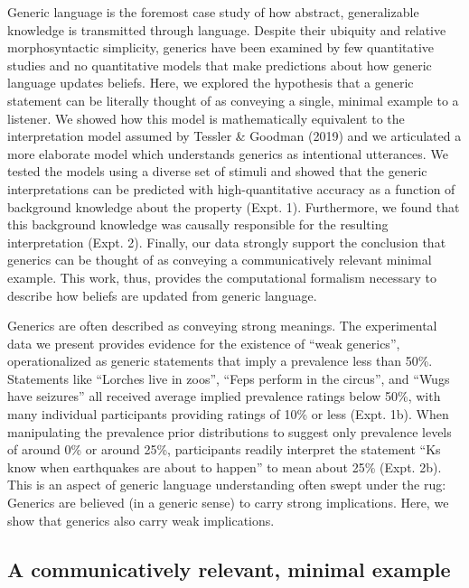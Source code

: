 \documentclass[floatsintext,doc]{apa6}
\begin{document}
Generic language is the foremost case study of how abstract, generalizable knowledge is transmitted through language.
Despite their ubiquity and relative morphosyntactic simplicity, generics have been examined by few quantitative studies and no quantitative models that make predictions about how generic language updates beliefs.
Here, we explored the hypothesis that a generic statement can be literally thought of as conveying a single, minimal example to a listener.
We showed how this model is mathematically equivalent to the interpretation model assumed by Tessler \& Goodman (2019) and we articulated a more elaborate model which understands generics as intentional utterances.
We tested the models using a diverse set of stimuli and showed that the generic interpretations can be predicted with high-quantitative accuracy as a function of background knowledge about the property (Expt. 1).
Furthermore, we found that this background knowledge was causally responsible for the resulting interpretation (Expt. 2).
Finally, our data strongly support the conclusion that generics can be thought of as conveying a communicatively relevant minimal example. 
This work, thus, provides the computational formalism necessary to describe how beliefs are updated from generic language.

Generics are often described as conveying strong meanings.
The experimental data we present provides evidence for the existence of \enquote{weak generics}, operationalized as generic statements that imply a prevalence less than 50\%.
Statements like \enquote{Lorches live in zoos}, \enquote{Feps perform in the circus}, and \enquote{Wugs have seizures} all received average implied prevalence ratings below 50\%, with many individual participants providing ratings of 10\% or less (Expt. 1b).
When manipulating the prevalence prior distributions to suggest only prevalence levels of around 0\% or around 25\%, participants readily interpret the statement \enquote{Ks know when earthquakes are about to happen} to mean about 25\% (Expt. 2b).
This is an aspect of generic language understanding often swept under the rug: Generics are believed (in a generic sense) to carry strong implications.
Here, we show that generics also carry weak implications.

\subsection{A communicatively relevant, minimal example}
\end{document}

